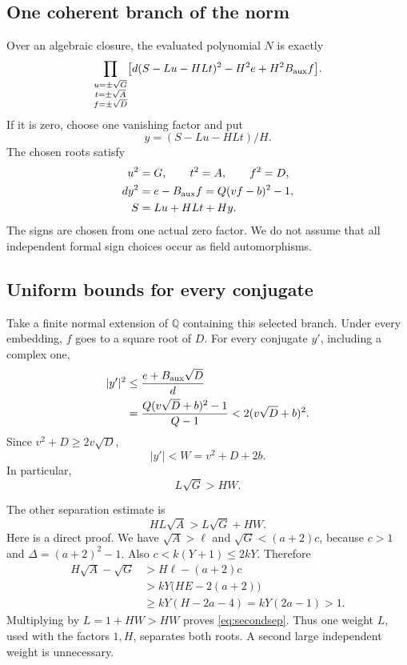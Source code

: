\documentclass[11pt]{article}
\theoremstyle{remark}\newtheorem{remark}[theorem]{Remark}
\newcommand{\Q}{\mathbb Q}
\begin{document}
\subsection{One coherent branch of the norm}

Over an algebraic closure, the evaluated polynomial \(N\) is exactly
\begin{equation}\label{eq:signproduct}
 \prod_{\substack{u=\pm\sqrt G\\t=\pm\sqrt A\\f=\pm\sqrt D}}
 \bigl[d(S-Lu-HLt)^2-H^2e+H^2B_{\rm aux}f\bigr].
\end{equation}
If it is zero, choose one vanishing factor and put
\[
 y=(S-Lu-HLt)/H.
\]
The chosen roots satisfy
\begin{align}
 u^2&=G,\qquad t^2=A,\qquad f^2=D,\label{eq:roots}\\
 dy^2&=e-B_{\rm aux}f=Q(vf-b)^2-1,\label{eq:yrelation}\\
 S&=Lu+HLt+Hy.\label{eq:separated}
\end{align}
The signs are chosen from one actual zero factor. We do not assume
that all independent formal sign choices occur as field automorphisms.

\subsection{Uniform bounds for every conjugate}

Take a finite normal extension of \(\Q\) containing this selected
branch. Under every embedding, \(f\) goes to a square root of \(D\).
For every conjugate \(y'\), including a complex one,
\begin{align*}
 |y'|^2
 &\le \frac{e+B_{\rm aux}\sqrt D}{d}\\
 &=\frac{Q(v\sqrt D+b)^2-1}{Q-1}
 <2(v\sqrt D+b)^2.
\end{align*}
Since \(v^2+D\ge2v\sqrt D\),
\begin{equation}\label{eq:ybound}
 |y'|<W=v^2+D+2b.
\end{equation}
In particular,
\begin{equation}\label{eq:firstsep}
 L\sqrt G>HW.
\end{equation}

The other separation estimate is
\begin{equation}\label{eq:secondsep}
 HL\sqrt A>L\sqrt G+HW.
\end{equation}
Here is a direct proof. We have \(\sqrt A>\ell\) and
\(\sqrt G<(a+2)c\), because \(c>1\) and
\(\Delta=(a+2)^2-1\). Also
\(c<k(Y+1)\le2kY\). Therefore
\begin{align*}
 H\sqrt A-\sqrt G
 &>H\ell-(a+2)c\\
 &>kY\bigl(HE-2(a+2)\bigr)\\
 &\ge kY(H-2a-4)=kY(2a-1)>1.
\end{align*}
Multiplying by \(L=1+HW>HW\) proves \eqref{eq:secondsep}.
Thus one weight \(L\), used with the factors \(1,H\), separates
both roots. A second large independent weight is unnecessary.
\end{document}
